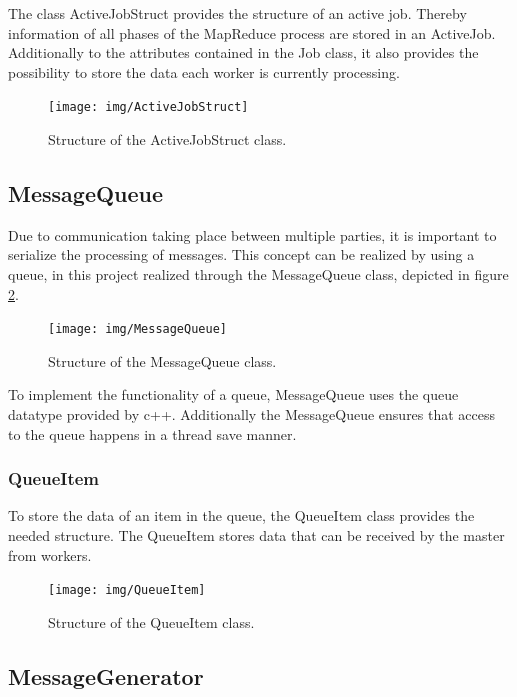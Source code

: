 \documentclass[12pt, letterpaper]{article}
\begin{document}
The class ActiveJobStruct provides the structure of an active job. Thereby information of all phases of the MapReduce process are stored in an ActiveJob. Additionally to the attributes contained in the Job class, it also provides the possibility to store the data each worker is currently processing.

\begin{figure}[h]
	\centering
	\texttt{[image: img/ActiveJobStruct]}
	\caption{Structure of the ActiveJobStruct class.}
	\label{fig:classes_ActiveJobStruct}
\end{figure}
\pagebreak

\subsection{MessageQueue}

Due to communication taking place between multiple parties, it is important to serialize the processing of messages. This concept can be realized by using a queue, in this project realized through the MessageQueue class, depicted in figure \ref{fig:classes_MessageQueue}.

\begin{figure}[h]
	\centering
	\texttt{[image: img/MessageQueue]}
	\caption{Structure of the MessageQueue class.}
	\label{fig:classes_MessageQueue}
\end{figure}

To implement the functionality of a queue, MessageQueue uses the queue datatype provided by c++. Additionally the MessageQueue ensures that access to the queue happens in a thread save manner. 

\subsubsection{QueueItem}

To store the data of an item in the queue, the QueueItem class provides the needed structure. 
The QueueItem stores data that can be received by the master from workers.

\begin{figure}[h]
	\centering
	\texttt{[image: img/QueueItem]}
	\caption{Structure of the QueueItem class.}
	\label{fig:classes_QueueItem}
\end{figure}

\subsection{MessageGenerator}
\end{document}
